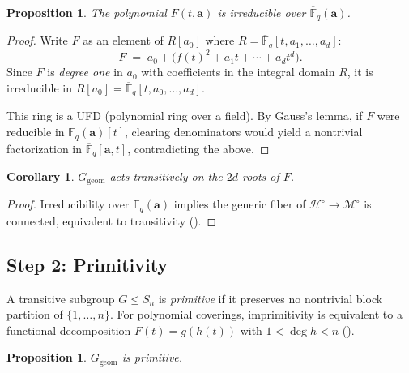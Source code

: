 \documentclass[11pt, a4paper]{article}
\newtheorem{proposition}[theorem]{Proposition}
\newtheorem{corollary}[theorem]{Corollary}
\theoremstyle{definition}
\theoremstyle{remark}
\newcommand{\Fqbar}{\overline{\mathbb{F}}_q}
\begin{document}
\begin{proposition}\label{prop:irred}
The polynomial $F(t,\mathbf{a})$ is irreducible over
$\Fqbar(\mathbf{a})$.
\end{proposition}

\begin{proof}
Write $F$ as an element of $R[a_0]$ where
$R = \Fqbar[t, a_1, \ldots, a_d]$:
\[
    F \;=\; a_0 + \bigl(f(t)^2 + a_1 t + \cdots + a_d t^d\bigr).
\]
Since $F$ is \emph{degree one} in $a_0$ with coefficients in the
integral domain $R$, it is irreducible in
$R[a_0] = \Fqbar[t, a_0, \ldots, a_d]$.

This ring is a UFD (polynomial ring over a field).
By Gauss's lemma, if $F$ were reducible in
$\Fqbar(\mathbf{a})[t]$, clearing denominators would yield
a nontrivial factorization in $\Fqbar[\mathbf{a}, t]$,
contradicting the above.
\end{proof}

\begin{corollary}\label{cor:transitive}
$G_{\mathrm{geom}}$ acts transitively on the $2d$ roots of $F$.
\end{corollary}

\begin{proof}
Irreducibility over $\Fqbar(\mathbf{a})$ implies the generic fiber
of $\mathcal{H}^\circ \to \mathcal{M}^\circ$ is connected,
equivalent to transitivity (\cite[Exp.~V, Prop.~8.2]{SGA1}).
\end{proof}

\subsection{Step 2: Primitivity}\label{subsec:primitive}

A transitive subgroup $G \le S_n$ is \emph{primitive} if it
preserves no nontrivial block partition of $\{1,\ldots,n\}$.
For polynomial coverings, imprimitivity is equivalent to a
functional decomposition $F(t) = g(h(t))$ with
$1 < \deg h < n$
(\cite{mueller1993, turnwald1995}).

\begin{proposition}\label{prop:primitive}
$G_{\mathrm{geom}}$ is primitive.
\end{proposition}
\end{document}
